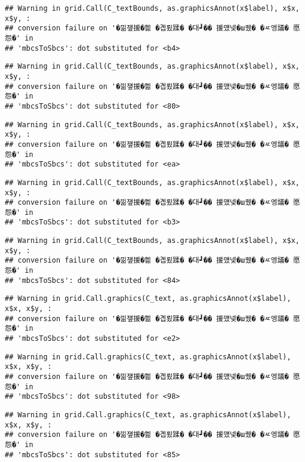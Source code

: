 \documentclass[
]{article}
\begin{document}
\begin{verbatim}
## Warning in grid.Call(C_textBounds, as.graphicsAnnot(x$label), x$x, x$y, :
## conversion failure on '�낆쟾援�쁾 �곕룄蹂� �대┛�� 援먰넻�ш퀬� �ㅼ엥議� 愿怨�' in
## 'mbcsToSbcs': dot substituted for <b4>
\end{verbatim}

\begin{verbatim}
## Warning in grid.Call(C_textBounds, as.graphicsAnnot(x$label), x$x, x$y, :
## conversion failure on '�낆쟾援�쁾 �곕룄蹂� �대┛�� 援먰넻�ш퀬� �ㅼ엥議� 愿怨�' in
## 'mbcsToSbcs': dot substituted for <80>
\end{verbatim}

\begin{verbatim}
## Warning in grid.Call(C_textBounds, as.graphicsAnnot(x$label), x$x, x$y, :
## conversion failure on '�낆쟾援�쁾 �곕룄蹂� �대┛�� 援먰넻�ш퀬� �ㅼ엥議� 愿怨�' in
## 'mbcsToSbcs': dot substituted for <ea>
\end{verbatim}

\begin{verbatim}
## Warning in grid.Call(C_textBounds, as.graphicsAnnot(x$label), x$x, x$y, :
## conversion failure on '�낆쟾援�쁾 �곕룄蹂� �대┛�� 援먰넻�ш퀬� �ㅼ엥議� 愿怨�' in
## 'mbcsToSbcs': dot substituted for <b3>
\end{verbatim}

\begin{verbatim}
## Warning in grid.Call(C_textBounds, as.graphicsAnnot(x$label), x$x, x$y, :
## conversion failure on '�낆쟾援�쁾 �곕룄蹂� �대┛�� 援먰넻�ш퀬� �ㅼ엥議� 愿怨�' in
## 'mbcsToSbcs': dot substituted for <84>
\end{verbatim}

\begin{verbatim}
## Warning in grid.Call.graphics(C_text, as.graphicsAnnot(x$label), x$x, x$y, :
## conversion failure on '�낆쟾援�쁾 �곕룄蹂� �대┛�� 援먰넻�ш퀬� �ㅼ엥議� 愿怨�' in
## 'mbcsToSbcs': dot substituted for <e2>
\end{verbatim}

\begin{verbatim}
## Warning in grid.Call.graphics(C_text, as.graphicsAnnot(x$label), x$x, x$y, :
## conversion failure on '�낆쟾援�쁾 �곕룄蹂� �대┛�� 援먰넻�ш퀬� �ㅼ엥議� 愿怨�' in
## 'mbcsToSbcs': dot substituted for <98>
\end{verbatim}

\begin{verbatim}
## Warning in grid.Call.graphics(C_text, as.graphicsAnnot(x$label), x$x, x$y, :
## conversion failure on '�낆쟾援�쁾 �곕룄蹂� �대┛�� 援먰넻�ш퀬� �ㅼ엥議� 愿怨�' in
## 'mbcsToSbcs': dot substituted for <85>
\end{verbatim}
\end{document}
